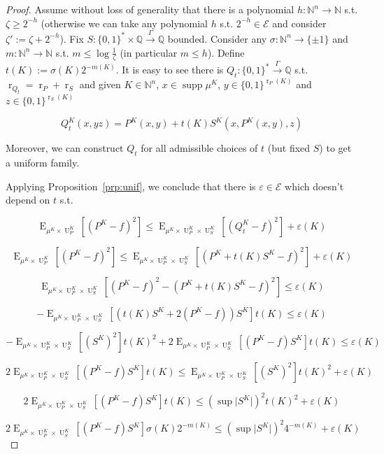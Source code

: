 \documentclass{article}
\numberwithin{equation}{section}
\theoremstyle{definition}
\theoremstyle{plain}
\newcommand{\Bool}{\{0,1\}}
\newcommand{\Words}{{\Bool^*}}
\newcommand{\WordsLen}[1]{{\Bool^{#1}}}
\DeclareMathOperator{\Supp}{supp}
\DeclareMathOperator{\E}{E}
\DeclareMathOperator{\R}{r}
\DeclareMathOperator{\Un}{U}
\newcommand{\Nats}{\mathbb{N}}
\newcommand{\Rats}{\mathbb{Q}}
\newcommand{\Abs}[1]{\lvert #1 \rvert}
\newcommand{\Fall}{\mathcal{E}}
\newcommand{\Scheme}{\xrightarrow{\Gamma}}
\begin{document}
\begin{proof}

Assume without loss of generality that there is a polynomial ${h: \Nats^n \rightarrow \Nats}$ s.t. $\zeta \geq 2^{-h}$ (otherwise we can take any polynomial $h$ s.t. $2^{-h} \in \Fall$ and consider $\zeta':=\zeta+2^{-h}$). Fix $S: \Words \times \Rats \Scheme \Rats$ bounded. Consider any ${\sigma: \Nats^n \rightarrow \{ \pm 1 \}}$ and $m: \Nats^n \rightarrow \Nats$ s.t. $m \leq \log \frac{1}{\zeta}$ (in particular ${m \leq h}$). Define ${t(K) := \sigma(K) 2^{-m(K)}}$. It is easy to see there is ${Q_t: \Words \Scheme \Rats}$ s.t. ${\R_{Q_t}=\R_P+\R_S}$ and given $K \in \Nats^n$, $x \in \Supp \mu^{K}$, ${y \in \WordsLen{\R_P(K)}}$ and ${z \in \WordsLen{ \R_S(K)}}$

$$Q_t^{K}(x,yz) = P^{K}(x,y) + t(K) S^{K}(x,P^{K}(x,y),z)$$

Moreover, we can construct $Q_t$ for all admissible choices of $t$ (but fixed $S$) to get a uniform family.

Applying Proposition~\ref{prp:unif}, we conclude that there is $\varepsilon \in \Fall$ which doesn't depend on $t$ s.t.

$$\E_{\mu^{K} \times \Un_P^{K}}[(P^{K} - f)^2] \leq \E_{\mu^{K} \times \Un_P^{K} \times \Un_S^{K}}[(Q_t^{K} - f)^2] + \varepsilon(K)$$

$$\E_{\mu^{K} \times \Un_P^{K}}[(P^{K} - f)^2] \leq \E_{\mu^{K} \times \Un_P^{K} \times \Un_S^{K}}[(P^{K} + t(K)S^{K}  - f)^2] + \varepsilon(K)$$

$$\E_{\mu^{K} \times \Un_P^{K} \times \Un_S^{K}}[(P^{K} - f)^2 - (P^{K} + t(K)S^{K} - f)^2] \leq \varepsilon(K)$$

$$-\E_{\mu^{K} \times \Un_P^{K} \times \Un_S^{K}}[(t(K)S^{K} + 2 (P^{K} - f)) S^{K}] t(K) \leq \varepsilon(K)$$

$$-\E_{\mu^{K} \times \Un_P^{K} \times \Un_S^{K}}[(S^{K})^2] t(K)^2 + 2 \E_{\mu^{K} \times \Un_P^{K} \times \Un_S^{K}}[(P^{K} - f) S^{K}] t(K) \leq \varepsilon(K)$$

$$2 \E_{\mu^{K} \times \Un_P^{K} \times \Un_S^{K}}[(P^{K} - f) S^{K}] t(K) \leq \E_{\mu^{K} \times \Un_P^{K} \times \Un_S^{K}}[(S^{K})^2] t(K)^2 + \varepsilon(K)$$

$$2 \E_{\mu^{K} \times \Un_P^{K} \times \Un_S^{K}}[(P^{K} - f) S^{K}] t(K) \leq (\sup \Abs{S^{K}})^2 t(K)^2 + \varepsilon(K)$$

$$2 \E_{\mu^{K} \times \Un_P^{K} \times \Un_S^{K}}[(P^{K} - f) S^{K}] \sigma(K) 2^{-m(K)} \leq (\sup \Abs{S^{K}})^2 4^{-m(K)} + \varepsilon(K)$$


\end{proof}
\end{document}
